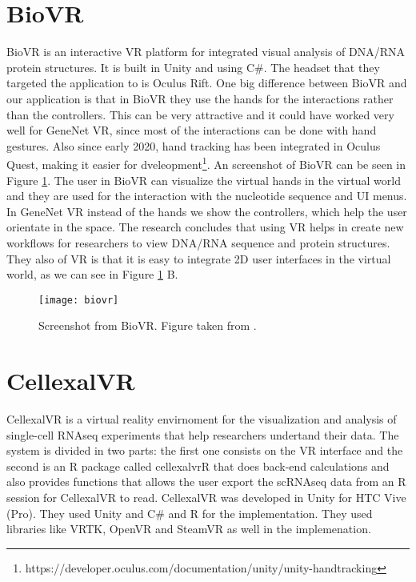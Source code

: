 \section{BioVR}
BioVR is an interactive VR platform for integrated visual analysis of DNA/RNA protein structures\cite{biovr}. It is built in Unity and using C\#. The headset that they targeted the application to is Oculus Rift. One big difference between BioVR and our application is that in BioVR they use the hands for the interactions rather than the controllers. This can be very attractive and it could have worked very well for GeneNet VR, since most of the interactions can be done with hand gestures. Also since early 2020, hand tracking has been integrated in Oculus Quest, making it easier for dveleopment\footnote{https://developer.oculus.com/documentation/unity/unity-handtracking}.
An screenshot of BioVR can be seen in Figure \ref{fig:biovr}. The user in BioVR can visualize the virtual hands in the virtual world and they are used for the interaction with the nucleotide sequence and UI menus. In GeneNet VR instead of the hands we show the controllers, which help the user orientate in the space. The research concludes that using VR helps in create new workflows for researchers to view DNA/RNA sequence and protein structures. They also  of VR is that it is easy to integrate 2D user interfaces in the virtual world, as we can see in Figure \ref{fig:biovr} B.

\begin{figure}[h!]
    \centering%
    \texttt{[image: biovr]}
    \caption{Screenshot from BioVR. Figure taken from \cite{biovr}.}
    \label{fig:biovr}
\end{figure}%

\section{CellexalVR}
CellexalVR is a virtual reality envirnoment for the visualization and analysis of single-cell RNAseq experiments that help researchers undertand their data\cite{cellexalvr}. The system is divided in two parts: the first one consists on the VR interface and the second is an R package called cellexalvrR that does back-end calculations and also provides functions that allows the user export the scRNAseq data from an R session for CellexalVR to read. CellexalVR was developed in Unity for HTC Vive (Pro). They used Unity and C\# and R for the implementation. They used libraries like VRTK, OpenVR and SteamVR as well in the implemenation.


